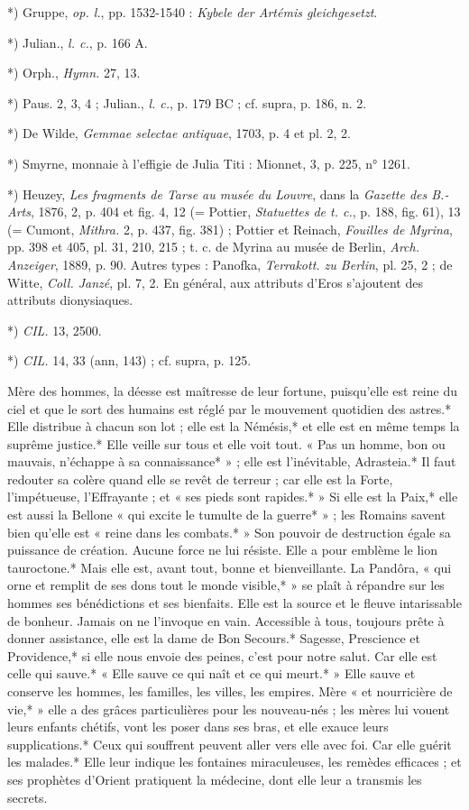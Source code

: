 \documentclass[a4paper, 11pt, oneside, polutonikogreek, french]{article}
\begin{document}
*) Gruppe, \emph{op. l.}, pp. 1532-1540 : \emph{Kybele der Artémis gleichgesetzt}.

*) Julian., \emph{l. c.}, p. 166 A.

*) Orph., \emph{Hymn.} 27, 13.

*) Paus. 2, 3, 4 ; Julian., \emph{l. c.}, p. 179 BC ; cf. supra, p. 186, n. 2.

*) De Wilde, \emph{Gemmae selectae antiquae}, 1703, p. 4 et pl. 2, 2.

*) Smyrne, monnaie à l'effigie de Julia Titi : Mionnet, 3, p. 225, n° 1261.

*) Heuzey, \emph{Les fragments de Tarse au musée du Louvre}, dans la \emph{Gazette des B.-Arts}, 1876, 2, p. 404 et fig. 4, 12 (= Pottier, \emph{Statuettes de t. c.}, p. 188, fig. 61), 13 (= Cumont, \emph{Mithra.} 2, p. 437, fig. 381) ; Pottier et Reinach, \emph{Fouilles de Myrina}, pp. 398 et 405, pl. 31, 210, 215 ; t. c. de Myrina au musée de Berlin, \emph{Arch. Anzeiger}, 1889, p. 90. Autres types : Panofka, \emph{Terrakott. zu Berlin}, pl. 25, 2 ; de Witte, \emph{Coll. Janzé}, pl. 7, 2. En général, aux attributs d'Eros s'ajoutent des attributs dionysiaques.

*) \emph{CIL.} 13, 2500.

*) \emph{CIL.} 14, 33 (ann, 143) ; cf. supra, p. 125.

Mère des hommes, la déesse est maîtresse de leur fortune, puisqu'elle est reine du ciel et que le sort des humains est réglé par le mouvement quotidien des astres.* Elle distribue à chacun son lot ; elle est la Némésis,* et elle est en même temps la suprême justice.* Elle veille sur tous et elle voit tout. « Pas un homme, bon ou mauvais, n'échappe à sa connaissance* » ; elle est l'inévitable, Adrasteia.* Il faut redouter sa colère quand elle se revêt de terreur ; car elle est la Forte, l'impétueuse, l'Effrayante ; et « ses pieds sont rapides.* » Si elle est la Paix,* elle est aussi la Bellone « qui excite le tumulte de la guerre* » ; les Romains savent bien qu'elle est « reine dans les combats.* » Son pouvoir de destruction égale sa puissance de création. Aucune force ne lui résiste. Elle a pour emblème le lion tauroctone.* Mais elle est, avant tout, bonne et bienveillante. La Pandôra, « qui orne et remplit de ses dons tout le monde visible,* » se plaît à répandre sur les hommes ses bénédictions et ses bienfaits. Elle est la source et le fleuve intarissable de bonheur. Jamais on ne l'invoque en vain. Accessible à tous, toujours prête à donner assistance, elle est la dame de Bon Secours.* Sagesse, Prescience et Providence,* si elle nous envoie des peines, c'est pour notre salut. Car elle est celle qui sauve.* « Elle sauve ce qui naît et ce qui meurt.* » Elle sauve et conserve les hommes, les familles, les villes, les empires. Mère « et nourricière de vie,* » elle a des grâces particulières pour les nouveau-nés ; les mères lui vouent leurs enfants chétifs, vont les poser dans ses bras, et elle exauce leurs supplications.* Ceux qui souffrent peuvent aller vers elle avec foi. Car elle guérit les malades.* Elle leur indique les fontaines miraculeuses, les remèdes efficaces ; et ses prophètes d'Orient pratiquent la médecine, dont elle leur a transmis les secrets.
\end{document}

